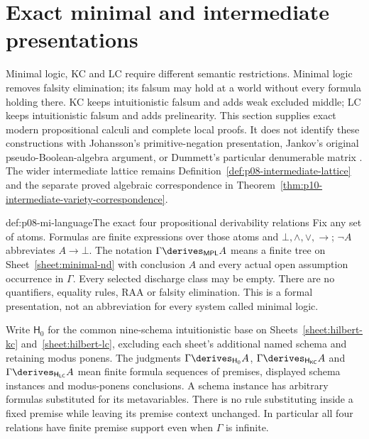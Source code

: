 \section{Exact minimal and intermediate presentations}
\label{sec:p08-minimal-and-intermediate-presentations}

Minimal logic, KC and LC require different semantic restrictions. Minimal
logic removes falsity elimination; its falsum may hold at a world without
every formula holding there. KC keeps intuitionistic falsum and adds weak
excluded middle; LC keeps intuitionistic falsum and adds prelinearity.
This section supplies exact modern propositional calculi and complete
local proofs. It does not identify these constructions with Johansson's
primitive-negation presentation, Jankov's original pseudo-Boolean-algebra
argument, or Dummett's particular denumerable matrix
\cite[Section~3.1]{ColacitoDeJonghVargas2016SubminimalDraft}
\cite{Jankov1968WeakExcludedMiddle,Dummett1959}.
The wider intermediate lattice remains
Definition~\ref{def:p08-intermediate-lattice} and the separate proved
algebraic correspondence in Theorem~\ref{thm:p10-intermediate-variety-correspondence}.

\begin{hbdefinition}{def:p08-mi-language}{The exact four propositional derivability relations}
Fix any set of atoms. Formulas are finite expressions over those atoms and
\(\bot,\land,\lor,\to\); \(\neg A\) abbreviates \(A\to\bot\).
The notation \(\Gamma\derives_{\mathsf{MPL}}A\) means a finite tree on
Sheet~\ref{sheet:minimal-nd} with conclusion \(A\) and every actual open
assumption occurrence in \(\Gamma\). Every selected discharge class may
be empty. There are no quantifiers, equality rules, RAA or falsity
elimination. This is a formal presentation, not an abbreviation for every
system called minimal logic.

Write \(\mathsf H_0\) for the common nine-schema intuitionistic base on
Sheets~\ref{sheet:hilbert-kc} and~\ref{sheet:hilbert-lc}, excluding each
sheet's additional named schema and retaining modus ponens. The judgments
\(\Gamma\derives_{\mathsf H_0}A\),
\(\Gamma\derives_{\mathsf H_{\mathsf{KC}}}A\) and
\(\Gamma\derives_{\mathsf H_{\mathsf{LC}}}A\) mean finite formula
sequences of premises, displayed schema instances and modus-ponens
conclusions. A schema instance has arbitrary formulas substituted for its
metavariables. There is no rule substituting inside a fixed premise while
leaving its premise context unchanged. In particular all four relations
have finite premise support even when \(\Gamma\) is infinite.
\end{hbdefinition}

